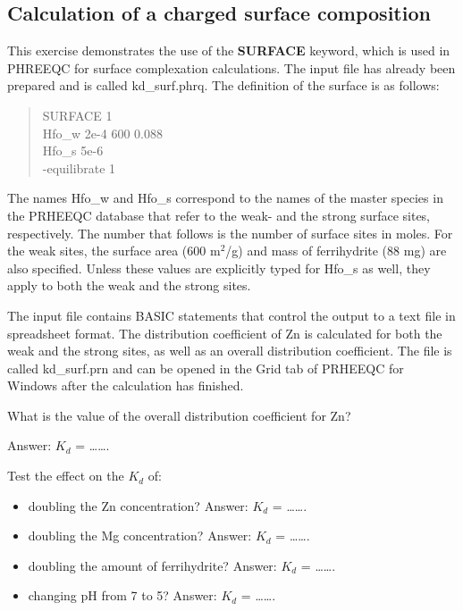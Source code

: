 \subsection{Calculation of a charged surface composition}
This exercise demonstrates the use of the \textbf{SURFACE} keyword, which is used in PHREEQC for surface complexation calculations. The input file has already been prepared and is called {\color{red}kd\_surf.phrq}. The definition of the surface is as follows:

\begin{quote}
	SURFACE 1 \\
	Hfo\_w	2e-4	600	0.088 \\
	Hfo\_s	5e-6 \\
	-equilibrate 1 
\end{quote}

The names {\color{red}Hfo\_w} and {\color{red}Hfo\_s} correspond to the names of the master species in the PRHEEQC database that refer to the weak- and the strong surface sites, respectively. The number that follows is the number of surface sites in moles. For the weak sites, the surface area (600 m$^2$/g) and mass of ferrihydrite (88 mg) are also specified. Unless these values are explicitly typed for Hfo\_s as well, they apply to both the weak and the strong sites.

The input file contains BASIC statements that control the output to a text file in spreadsheet format. The distribution coefficient of Zn is calculated for both the weak and the strong sites, as well as an overall distribution coefficient. The file is called {\color{red}kd\_surf.prn} and can be opened in the Grid tab of PRHEEQC for Windows after the calculation has finished.

What is the value of the overall distribution coefficient for Zn? 

Answer: $K_d$ = \ldots\ldots.

Test the effect on the $K_d$ of:

\begin{itemize}

\item doubling the Zn concentration? Answer: $K_d$ = \ldots\ldots.

\item doubling the Mg concentration? Answer: $K_d$ = \ldots\ldots.

\item doubling the amount of ferrihydrite? Answer: $K_d$ = \ldots\ldots.

\item changing pH from 7 to 5? Answer: $K_d$ = \ldots\ldots.

\end{itemize}

